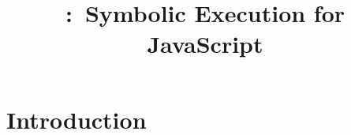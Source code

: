 \documentclass[sigconf, anonymous, review]{acmart}
\title[\cosette:~Symbolic Execution for JavaScript]{\cosette:~Symbolic Execution for JavaScript}
\newif\ifComments
\newcommand{\pg}[1]{%
\ifComments
\begin{center}
\fbox{\begin{minipage}{0.4\textwidth} \color{red}
{\rm PG: \small #1}
\end{minipage}}
\end{center}
\fi}
\newcommand{\pmax}[1]{%
\ifComments
\begin{center}
\fbox{\begin{minipage}{0.4\textwidth} \color{blue}
{\rm PM: \small #1}
\end{minipage}}
\end{center}
\fi}
\begin{document}
%

\maketitle 

\section{Introduction}


%
%
%
%
%
%
\end{document}
